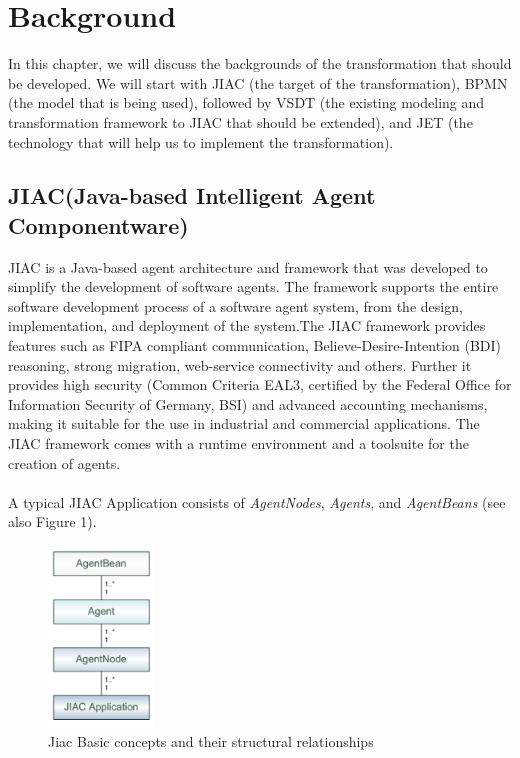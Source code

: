 \chapter{Background}

In this chapter, we will discuss the backgrounds of the transformation that should be developed. We will start with JIAC (the target of the transformation), BPMN (the model that is being used), followed by VSDT (the existing modeling and transformation framework to JIAC that should be extended), and JET (the technology that will help us to implement the transformation).
\section{JIAC(Java-based Intelligent Agent Componentware)}
JIAC \cite{11,15,4,1} is a Java-based agent architecture and framework that was developed to simplify the development of software agents. The framework supports the entire software development process of a software agent system, from the design, implementation, and deployment of the system.The JIAC framework provides features such as FIPA compliant communication,
Believe-Desire-Intention (BDI) reasoning, strong migration, web-service
connectivity and others. Further it provides high security (Common Criteria EAL3,
certified by the Federal Office for Information Security of Germany, BSI) and advanced
accounting mechanisms, making it suitable for the use in industrial and
commercial applications. The JIAC framework comes with a runtime environment
and a toolsuite for the creation of agents. \\\\ A typical JIAC Application consists of \textit{AgentNodes}, \textit{Agents}, and \textit{AgentBeans} (see also Figure 1).
\begin{figure}[h]
	\centering
		\includegraphics[width=0.25\textwidth]{images/jiac_basic.png}
		\caption{Jiac Basic concepts and their structural relationships \cite{11}}
	\label{fig:jiac_basic}
\end{figure}
